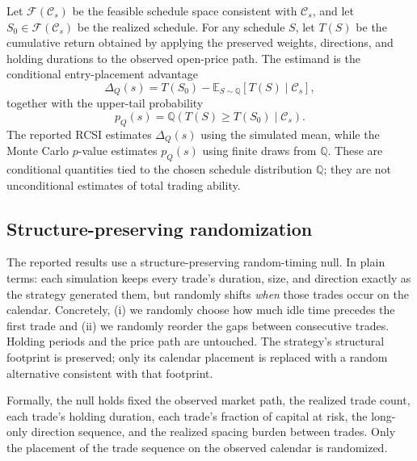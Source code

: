 \documentclass[risks,article,submit,pdftex,oneauthor]{Definitions/mdpi}
\begin{document}
Let $\mathcal{F}(\mathcal{C}_s)$ be the feasible schedule space consistent with $\mathcal{C}_s$, and let $S_0\in \mathcal{F}(\mathcal{C}_s)$ be the realized schedule. For any schedule $S$, let $T(S)$ be the cumulative return obtained by applying the preserved weights, directions, and holding durations to the observed open-price path. The estimand is the conditional entry-placement advantage
\[
\Delta_Q(s)=T(S_0)-\mathbb{E}_{S\sim \mathbb{Q}}\!\left[T(S)\mid \mathcal{C}_s\right],
\]
together with the upper-tail probability
\[
p_Q(s)=\mathbb{Q}\!\left(T(S)\ge T(S_0)\mid \mathcal{C}_s\right).
\]
The reported RCSI estimates $\Delta_Q(s)$ using the simulated mean, while the Monte Carlo $p$-value estimates $p_Q(s)$ using finite draws from $\mathbb{Q}$. These are conditional quantities tied to the chosen schedule distribution $\mathbb{Q}$; they are not unconditional estimates of total trading ability.

\subsection{Structure-preserving randomization}
\label{sec:spr}

The reported results use a structure-preserving random-timing null. In plain terms: each simulation keeps every trade's duration, size, and direction exactly as the strategy generated them, but randomly shifts \emph{when} those trades occur on the calendar. Concretely, (i) we randomly choose how much idle time precedes the first trade and (ii) we randomly reorder the gaps between consecutive trades. Holding periods and the price path are untouched. The strategy's structural footprint is preserved; only its calendar placement is replaced with a random alternative consistent with that footprint.

Formally, the null holds fixed the observed market path, the realized trade count, each trade's holding duration, each trade's fraction of capital at risk, the long-only direction sequence, and the realized spacing burden between trades. Only the placement of the trade sequence on the observed calendar is randomized.
\end{document}
